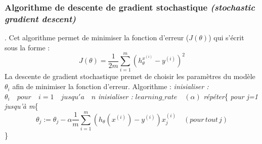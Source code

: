 \documentclass[a4paper,12pt]{article}
\begin{document}
\subsubsection{Algorithme de descente de gradient stochastique \textit{(stochastic gradient descent)}}.\newline
Cet algorithme permet de minimiser la fonction d'erreur ($J(\theta)$) qui s'écrit sous la forme : \newline
$$J(\theta) = \dfrac{1}{2m}\sum_{i=1}^{m} (h_{\theta}^{x^{(i)}} - y^{(i)})^2$$\newline  
\newline
La descente de gradient stochastique premet de choisir les paramètres du modèle $\theta_i$ afin de minimiser la fonction d'erreur.\newline
Algorithme : \newline
\textit{inisialiser :} $\theta_i\quad pour\quad i=1 \quad jusqu'a\quad n$\newline
\textit{inisialiser : }$learning\_rate\quad(\alpha)$\newline
\textit{répéter}\{\newline 
\hspace*{1cm}\textit{pour j=1 jusqu'à m}\{
$$\theta_j := \theta_j - \alpha  \dfrac{1}{m}\sum_{i = 1}^{m} (h_\theta(x^{(i)}) - y^{(i)})x_j^{(i)} \quad(pour\, tout \, j)$$
\hspace*{1cm}\}\newline
\end{document}
